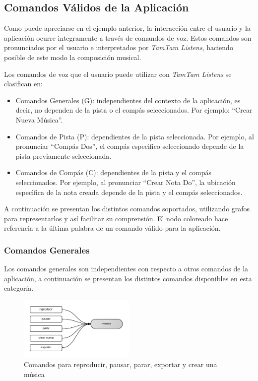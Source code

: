 \subsection{Comandos V\'alidos de la Aplicaci\'on}
\label{sec:comandos-validos}

Como puede apreciarse en el ejemplo anterior, la interacci\'on entre el usuario y la aplicaci\'on
ocurre {\'\i}ntegramente a trav\'es de comandos de voz. Estos comandos son pronunciados por el usuario
e interpretados por \emph{TamTam Listens}, haciendo posible de este modo la composici\'on musical. 

Los comandos de voz que el usuario puede utilizar con \emph{TamTam Listens} se clasifican en:

\begin{itemize}
    \item Comandos Generales (G): independientes del contexto de la aplicaci\'on, es decir, no dependen
    de la pista o el comp\'as seleccionados. Por ejemplo: ``Crear Nueva M\'usica''.
    \item Comandos de Pista (P): dependientes de la pista seleccionada. Por ejemplo, al pronunciar 
    ``Comp\'as Dos'', el comp\'as espec{\'\i}fico seleccionado depende de la pista 
    previamente seleccionada.
    \item Comandos de Comp\'as (C): dependientes de la pista y el comp\'as seleccionados. Por ejemplo, 
    al pronunciar ``Crear Nota Do'', la ubicaci\'on espec{\'\i}fica de la nota creada depende de la
    pista y el comp\'as seleccionados.
\end{itemize}


A continuaci\'on se presentan los distintos comandos soportados, utilizando grafos para representarlos y 
as\'i facilitar su comprensi\'on. El nodo coloreado hace referencia a la \'ultima palabra de un comando 
v\'alido para la aplicaci\'on.

\subsubsection{Comandos Generales}

Los comandos generales son independientes con respecto a otros comandos de la aplicaci\'on, a continuaci\'on se presentan los distintos
comandos disponibles en esta categor\'ia. 
\begin{figure}[H] 
\centering
\includegraphics[width=0.5\textwidth]{./graphics/cmd-musica.png}
\caption{Comandos para reproducir, pausar, parar, exportar y crear una m\'usica}
\label{figure:cmd-crear-musica}
\end{figure}

